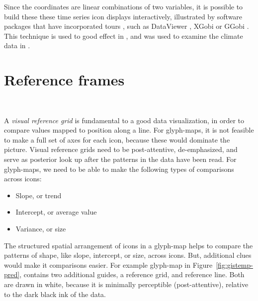 \documentclass[oneside]{article}
\begin{document}
Since the coordinates are linear combinations of two variables, it is possible to build these these time series icon displays interactively, illustrated by software packages that have incorporated tours \citep{cook:2006}, such as DataViewer \citep{buja:1986}, XGobi \citep{swayne:1991} or GGobi \citep{swayne:2003}.  This technique is used to good effect in \citet{buja:1996a}, and was used to examine the climate data in \citet{hobbs:2010}.







\section{Reference frames}~\label{sec:reference}

A \emph{visual reference grid} \citep{cleveland:1993a} is fundamental to a good data visualization, in order to compare values mapped to position along a line. For glyph-maps, it is not feasible to make a full set of axes for each icon, because these would dominate the picture. Visual reference grids need to be post-attentive, de-emphasized, and serve as posterior look up after the patterns in the data have been read. For glyph-maps, we need to be able to make the following types of comparisons across icons:

\begin{itemize} \itemsep 0in
\item Slope, or trend
\item Intercept, or average value
\item Variance, or size
\end{itemize}

The structured spatial arrangement of icons in a glyph-map helps to compare the patterns of shape, like slope, intercept, or size, across icons. But, additional clues would make it comparisons easier. For example glyph-map in Figure~\ref{fig:gistemp-pred}, contains two additional guides, a reference grid, and reference line. Both are drawn in white, because it is minimally perceptible (post-attentive), relative to the dark black ink of the data.
\end{document}
